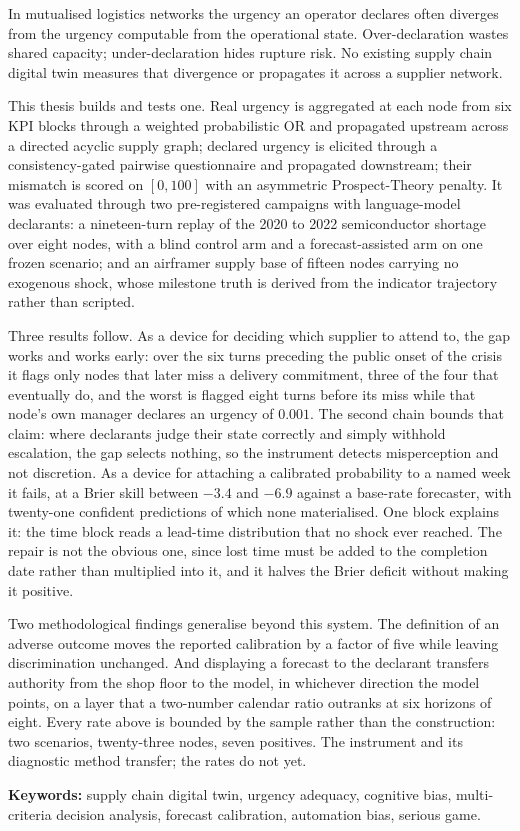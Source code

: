 In mutualised logistics networks the urgency an operator declares often diverges from the
urgency computable from the operational state. Over-declaration wastes shared capacity;
under-declaration hides rupture risk. No existing supply chain digital twin measures that
divergence or propagates it across a supplier network.

This thesis builds and tests one. Real urgency is aggregated at each node from six KPI
blocks through a weighted probabilistic OR and propagated upstream across a directed acyclic
supply graph; declared urgency is elicited through a consistency-gated pairwise questionnaire
and propagated downstream; their mismatch is scored on $[0,100]$ with an asymmetric
Prospect-Theory penalty. It was evaluated through two pre-registered campaigns with
language-model declarants: a nineteen-turn replay of the 2020 to 2022 semiconductor shortage
over eight nodes, with a blind control arm and a forecast-assisted arm on one frozen scenario;
and an airframer supply base of fifteen nodes carrying no exogenous shock, whose milestone
truth is derived from the indicator trajectory rather than scripted.

Three results follow. As a device for deciding which supplier to attend to, the gap works and
works early: over the six turns preceding the public onset of the crisis it flags only nodes
that later miss a delivery commitment, three of the four that eventually do, and the worst is
flagged eight turns before its miss while that node's own manager declares an urgency of
$0.001$. The second chain bounds that claim: where declarants judge their state correctly and
simply withhold escalation, the gap selects nothing, so the instrument detects misperception
and not discretion. As a device for attaching a calibrated
probability to a named week it fails, at a Brier skill between $-3.4$ and $-6.9$ against a
base-rate forecaster, with twenty-one confident predictions of which none materialised. One
block explains it: the time block reads a lead-time distribution that no shock ever reached.
The repair is not the obvious one, since lost time must be added to the completion date
rather than multiplied into it, and it halves the Brier deficit without making it positive.

Two methodological findings generalise beyond this system. The definition of an adverse
outcome moves the reported calibration by a factor of five while leaving discrimination
unchanged. And displaying a forecast to the declarant transfers authority from the shop floor
to the model, in whichever direction the model points, on a layer that a two-number calendar
ratio outranks at six horizons of eight. Every rate above is bounded by the sample rather than
the construction: two scenarios, twenty-three nodes, seven positives. The instrument and its
diagnostic method transfer; the rates do not yet.

\vspace{0.4cm}

\noindent\textbf{Keywords:} supply chain digital twin, urgency adequacy, cognitive bias,
multi-criteria decision analysis, forecast calibration, automation bias, serious game.
